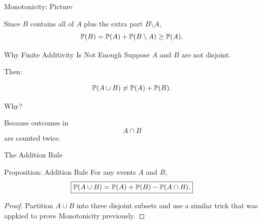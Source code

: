\begin{frame}{Monotonicity: Picture}

\begin{center}
\end{center}

\vspace{0.15cm}

\begin{center}
Since $B$ contains all of $A$ plus the extra part $B\setminus A$,
\[
\mathbb{P}(B)=\mathbb{P}(A)+\mathbb{P}(B\setminus A)\geq \mathbb{P}(A).
\]
\end{center}

\end{frame}











\begin{frame}{Why Finite Additivity Is Not Enough}
Suppose $A$ and $B$ are not disjoint.

Then:

\[
\mathbb{P}(A\cup B)
\neq
\mathbb{P}(A)+\mathbb{P}(B).
\]

Why?

\vspace{0.2cm}

Because outcomes in
\[
A\cap B
\]
are counted twice.
\end{frame}

\begin{frame}{The Addition Rule}
\begin{keybox}{Proposition:  Addition Rule}
For any events $A$ and $B$,
\[
\boxed{
\mathbb{P}(A\cup B)
=
\mathbb{P}(A)+\mathbb{P}(B)-\mathbb{P}(A\cap B).
}
\]
\end{keybox}


\begin{proof}
    Partition $A\cup B$ into three disjoint subsets and use a similar trick that was appkied to prove Monotonicity previously.
\end{proof}




\end{frame}

